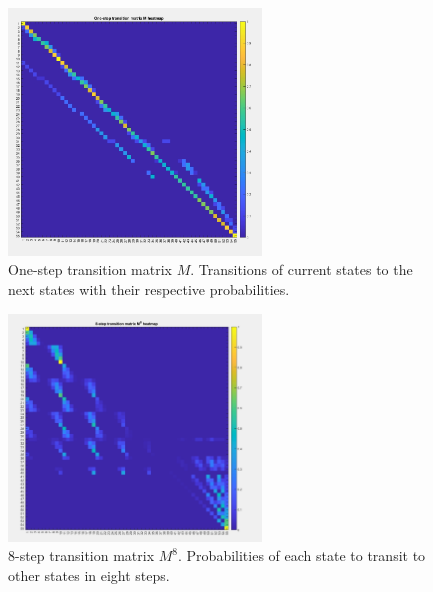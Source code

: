 \documentclass[12pt]{article}
\begin{document}
\begin{figure}[h!]
    \centering
    \includegraphics[width=0.6\textwidth]{media/A.jpg}
    \caption{One-step transition matrix $M$. Transitions of current states to the next states with their respective probabilities.}
    \label{fig:myimage}
\end{figure}
\begin{figure}[h!]
    \centering
    \includegraphics[width=0.6\textwidth]{media/B.jpg}
    \caption{8-step transition matrix $M^8$. Probabilities of each state to transit to other states in eight steps.}
    \label{fig:myimage}
\end{figure}
\end{document}
